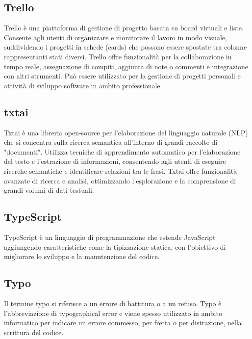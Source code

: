 \vspace{2em}
\subsection*{Trello}
\par Trello è una piattaforma di gestione di progetto basata su board virtuali e liste. Consente agli utenti di organizzare e monitorare il lavoro in modo visuale, suddividendo i progetti in schede (cards) che possono essere spostate tra colonne rappresentanti stati diversi. Trello offre funzionalità per la collaborazione in tempo reale, assegnazione di compiti, aggiunta di note o commenti e integrazione con altri strumenti. Può essere utilizzato per la gestione di progetti personali e attività di sviluppo software in ambito professionale.

\vspace{2em}
\subsection*{txtai}
\par Txtai è una libreria open-source per l'elaborazione del linguaggio naturale (NLP) che si concentra sulla ricerca semantica all'interno di grandi raccolte di "documenti". Utilizza tecniche di apprendimento automatico per l'elaborazione del testo e l'estrazione di informazioni, consentendo agli utenti di eseguire ricerche semantiche e identificare relazioni tra le frasi. Txtai offre funzionalità avanzate di ricerca e analisi, ottimizzando l'esplorazione e la comprensione di grandi volumi di dati testuali.

\vspace{2em}
\subsection*{TypeScript}
\par TypeScript è un linguaggio di programmazione che estende JavaScript aggiungendo caratteristiche come la tipizzazione statica, con l'obiettivo di migliorare lo sviluppo e la manutenzione del codice.

\vspace{2em}
\subsection*{Typo}
\par Il termine typo si riferisce a un errore di battitura o a un refuso. Typo è l'abbreviazione di typographical error e viene spesso utilizzato in ambito informatico per indicare un errore commesso, per fretta o per distrazione, nella scrittura del codice.
